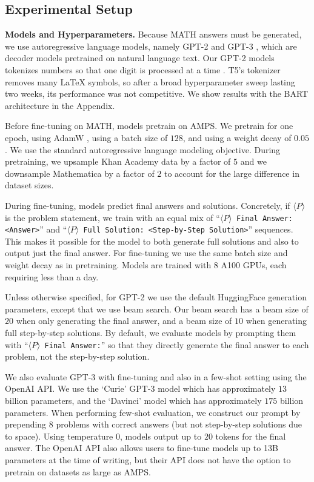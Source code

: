 \subsection{Experimental Setup} 

\textbf{Models and Hyperparameters.}\quad
Because MATH answers must be generated, we use autoregressive language models, namely GPT-2 \citep{Radford2016UnsupervisedRL} and GPT-3 \citep{Brown2020LanguageMA}, which are decoder models pretrained on natural language text. Our GPT-2 models tokenizes numbers so that one digit is processed at a time \citep{Henighan2020ScalingLF}. T5's \citep{Raffel2020ExploringTL} tokenizer removes many \LaTeX{} symbols, so after a broad hyperparameter sweep lasting two weeks, its performance was not competitive. We show results with the BART architecture in the Appendix.

Before fine-tuning on MATH, models pretrain on AMPS. We pretrain for one epoch, using AdamW \citep{Loshchilov2019DecoupledWD}, using a batch size of $128$, and using a weight decay of $0.05$. We use the standard autoregressive language modeling objective. During pretraining, we upsample Khan Academy data by a factor of $5$ and we downsample Mathematica by a factor of $2$ to account for the large difference in dataset sizes.

During fine-tuning, models predict final answers and solutions. Concretely, if $\langle P\rangle$ is the problem statement, we train with an equal mix of ``\texttt{$\langle P\rangle$ Final Answer: <Answer>}'' and ``\texttt{$\langle P\rangle$ Full Solution: <Step-by-Step Solution>}'' sequences. This makes it possible for the model to both generate full solutions and also to output just the  final answer. For fine-tuning we use the same batch size and weight decay as in pretraining. Models are trained with 8 A100 GPUs, each requiring less than a day.

Unless otherwise specified, for GPT-2 we use the default HuggingFace \citep{wolf-etal-2020-transformers} generation parameters, except that we use beam search. Our beam search has a beam size of $20$ when only generating the final answer, and a beam size of $10$ when generating full step-by-step solutions. By default, we evaluate models by prompting them with ``\texttt{$\langle P\rangle$ Final Answer:}'' so that they directly generate the final answer to each problem, not the step-by-step solution.

We also evaluate GPT-3 with fine-tuning and also in a few-shot setting using the OpenAI API. We use the `Curie' GPT-3 model which has approximately $13$ billion parameters, and the `Davinci' model which has approximately $175$ billion parameters. When performing few-shot evaluation, we construct our prompt by prepending $8$ problems with correct answers (but not step-by-step solutions due to space). Using temperature $0$, models output up to $20$ tokens for the final answer. The OpenAI API also allows users to fine-tune models up to 13B parameters at the time of writing, but their API does not have the option to pretrain on datasets as large as AMPS. 

